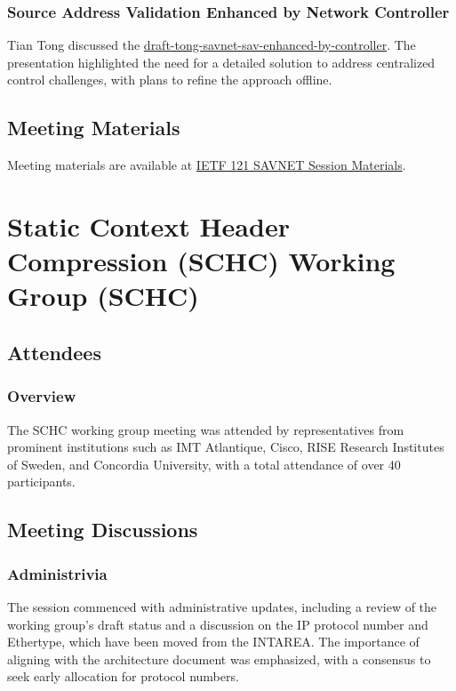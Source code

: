 \documentclass{article}
\begin{document}
\subsubsection{Source Address Validation Enhanced by Network Controller}
Tian Tong discussed the \href{https://datatracker.ietf.org/doc/draft-tong-savnet-sav-enhanced-by-controller}{draft-tong-savnet-sav-enhanced-by-controller}. The presentation highlighted the need for a detailed solution to address centralized control challenges, with plans to refine the approach offline.

\subsection{Meeting Materials}
Meeting materials are available at \href{https://datatracker.ietf.org/meeting/121/session/savnet}{IETF 121 SAVNET Session Materials}.




\newpage

\section{Static Context Header Compression (SCHC) Working Group (SCHC)}

\subsection{Attendees}
\subsubsection{Overview}
The SCHC working group meeting was attended by representatives from prominent institutions such as IMT Atlantique, Cisco, RISE Research Institutes of Sweden, and Concordia University, with a total attendance of over 40 participants.

\subsection{Meeting Discussions}

\subsubsection{Administrivia}
The session commenced with administrative updates, including a review of the working group's draft status and a discussion on the IP protocol number and Ethertype, which have been moved from the INTAREA. The importance of aligning with the architecture document was emphasized, with a consensus to seek early allocation for protocol numbers.
\end{document}

